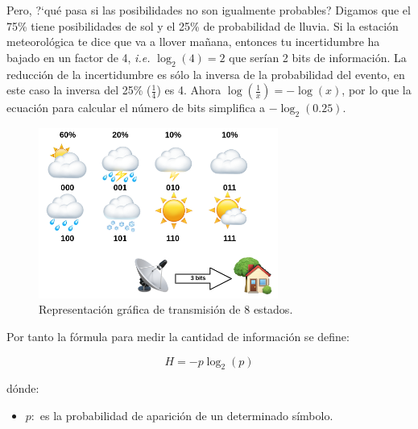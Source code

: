 \documentclass[a4paper,12pt]{article}
\begin{document}
Pero, ?`qué pasa si las posibilidades no son igualmente probables? Digamos que el 75\% tiene posibilidades de sol y el 25\% de probabilidad de lluvia. Si la estación meteorológica te dice que va a llover mañana, entonces tu incertidumbre ha bajado en un factor de 4, \textit{i.e.} $\log_2(4)=2$ que serían 2 bits de información. La reducción de la incertidumbre es sólo la inversa de la probabilidad del evento, en este caso la inversa del 25\% ($\frac{1}{4}$) es 4. Ahora $\log(\frac{1}{x})=-\log(x)$, por lo que la ecuación para calcular el número de bits simplifica a $-\log_2(0.25)$.

\begin{figure}[H]
	\begin{center}
		\includegraphics[width=0.7\textwidth]{geron_2.png}
		\caption{Representación gráfica de transmisión de 8 estados.}
		\label{fig:geron2}
	\end{center}
\end{figure}

%

Por tanto la fórmula para medir la cantidad de información se define:

$$ H = -p \log_2(p)$$

dónde:
\begin{itemize}[noitemsep, topsep=2pt]
	\item $p:$ es la probabilidad de aparición de un determinado símbolo.
\end{itemize}
\end{document}
